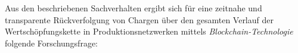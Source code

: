 




Aus den beschriebenen Sachverhalten ergibt sich für eine zeitnahe und transparente Rückverfolgung von Chargen über den gesamten Verlauf der Wertschöpfungskette in Produktionsnetzwerken mittels \textit{Blockchain-Technologie} folgende Forschungsfrage:

